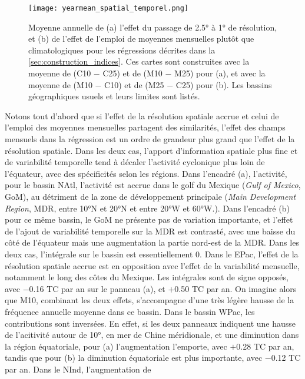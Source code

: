 \documentclass[../main.tex]{subfiles}
\begin{document}
\begin{figure}[tb]
    \centering
    \texttt{[image: yearmean\_spatial\_temporel.png]}
    \caption{Moyenne annuelle de (a) l'effet du passage de \ang{2.5} à \ang{1} de résolution, et (b) de l'effet de l'emploi de moyennes mensuelles plutôt que
    climatologiques pour les régressions décrites dans la \cref{sec:construction_indices}. Ces cartes sont construites avec la moyenne de (C10 $-$ C25) et de
    (M10 $-$ M25) pour (a), et avec la moyenne de (M10 $-$ C10) et de (M25 $-$ C25) pour (b). Les bassins géographiques usuels et leurs limites sont listés.}
    \label{fig:impact_spatial_temporel}
\end{figure}

Notons tout d'abord que si l'effet de la résolution spatiale accrue et celui de l'emploi des moyennes mensuelles partagent des similarités, l'effet des champs
mensuels dans la régression est un ordre de grandeur plus grand que l'effet de la résolution spatiale. Dans les deux cas, l'apport d'information spatiale plus
fine et de variabilité temporelle tend à décaler l'activité cyclonique plus loin de l'équateur, avec des spécificités selon les régions. Dans l'encadré (a),
l'activité, pour le bassin NAtl, l'activité est accrue dans le golf du Mexique (\textit{Gulf of Mexico}, GoM), au détriment de la zone de développement
principale (\textit{Main Development Region}, MDR, entre \ang{10}N et \ang{20}N et entre \ang{20}W et \ang{60}W.). Dans l'encadré (b) pour ce même bassin, le
GoM ne présente pas de variation importante, et l'effet de l'ajout de variabilité temporelle sur la MDR est contrasté, avec une baisse du côté de l'équateur
mais une augmentation la partie nord-est de la MDR. Dans les deux cas, l'intégrale sur le bassin est essentiellement \num{0}. Dans le EPac, l'effet de la
résolution spatiale accrue est en opposition avec l'effet de la variabilité mensuelle, notamment le long des côtes du Mexique. Les intégrales sont de signe
opposés, avec \num{-0.16} TC par an sur le panneau (a), et $+$\num{0.50} TC par an. On imagine alors que M10, combinant les deux effets, s'accompagne d'une très
légère hausse de la fréquence annuelle moyenne dans ce bassin. Dans le bassin WPac, les contributions sont inversées. En effet, si les deux panneaux indiquent
une hausse de l'acitivité autour de \ang{10}, en mer de Chine méridionale, et une diminution dans la région équatoriale, pour (a) l'augmentation l'emporte, avec
$+$\num{0.28} TC par an, tandis que pour (b) la diminution équatoriale est plus importante, avec \num{-0.12} TC par an. Dans le NInd, l'augmentation de
\end{document}
